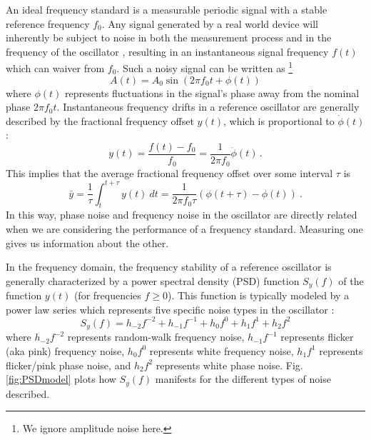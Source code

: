 An ideal frequency standard is a measurable periodic signal with a stable reference frequency $f_0$. Any signal generated by a real world device will inherently be subject to noise in both the measurement process and in the frequency of the oscillator \cite{RevModPhys.87.637}, resulting in an instantaneous signal frequency $f(t)$ which can waiver from $f_0$. Such a noisy signal can be written as \footnote{We ignore amplitude noise here.}
\begin{equation}  
A(t) = A_0 \sin{(2 \pi f_0 t + \phi (t))}
\end{equation}
where $\phi(t)$ represents fluctuations in the signal's phase away from the nominal phase $2 \pi f_0 t$. Instantaneous frequency drifts in a reference oscillator are generally described by the fractional frequency offset $y(t)$, which is proportional to $\dot{\phi} (t)$ \cite{FreqStands}:
\begin{equation}
y(t) = \frac{f(t) - f_0}{f_0} = \frac{1}{2 \pi f_0} \dot{\phi} (t) \, \text{.}
\label{eq:fracfreq}
\end{equation}
This implies that the average fractional frequency offset over some interval $\tau$ is
\begin{equation}
\bar{y} = \frac{1}{\tau} \int_{t}^{t + \tau}{y (t)} \ dt = \frac{1}{2 \pi f_0 \tau} ( \phi (t + \tau) - \phi (t) ) \ \text{.}
\label{eq:ybar}
\end{equation}
In this way, phase noise and frequency noise in the oscillator are directly related when we are considering the performance of a frequency standard. Measuring one gives us information about the other. 

In the frequency domain, the frequency stability of a reference oscillator is generally characterized by a power spectral density (PSD) function $S_y (f)$ of the function $y (t)$ (for frequencies $f \geq 0$). This function is typically modeled by a power law series which represents five specific noise types in the oscillator \cite{5570702,FreqStands}:
\begin{equation}
S_y (f) = h_{-2} f^{-2} + h_{-1} f^{-1} + h_{0} f^{0} + h_{1} f^{1} + h_{2} f^{2} 
\end{equation}
where $ h_{-2} f^{-2}$ represents random-walk frequency noise,  $h_{-1} f^{-1}$ represents flicker (aka pink) frequency noise, $h_{0} f^{0}$ represents white frequency noise, $h_{1} f^{1}$ represents flicker/pink phase noise, and $h_{2} f^{2}$ represents white phase noise. Fig. \ref{fig:PSDmodel} plots how $S_y (f)$ manifests for the different types of noise described. 

